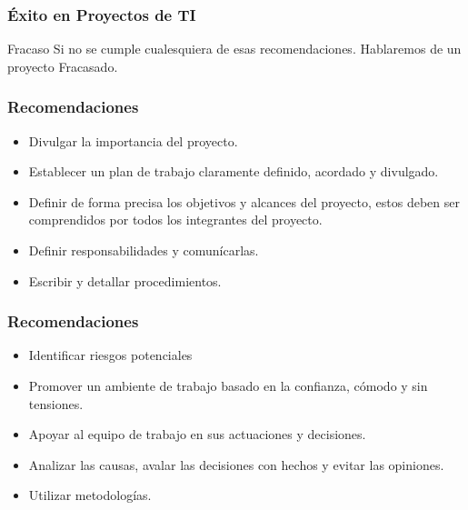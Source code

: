 \documentclass[12pt]{beamer}
\begin{document}
\begin{frame}
 \frametitle{Éxito en Proyectos de TI}
\begin{block}{Fracaso}
Si no se cumple cualesquiera de esas recomendaciones. Hablaremos de un proyecto \alert{Fracasado}. 
\end{block}
\end{frame}


\begin{frame}
 \frametitle{Recomendaciones}
\begin{itemize}
 \item<1-> Divulgar  la importancia del proyecto.
 \item<2-> Establecer  un plan de trabajo claramente definido, acordado y divulgado.
 \item<3-> Definir  de forma precisa los objetivos y alcances del proyecto, estos deben ser comprendidos por todos los integrantes del proyecto.
 \item<4-> Definir  responsabilidades y comunícarlas.
 \item<5-> Escribir y detallar procedimientos.
\end{itemize}
\end{frame}

\begin{frame}
 \frametitle{Recomendaciones}
\begin{itemize}
 \item<2-> Identificar riesgos potenciales
 \item<3-> Promover un ambiente de trabajo basado en la confianza, cómodo y sin tensiones.
 \item<4-> Apoyar al equipo de trabajo en sus actuaciones y decisiones.
 \item<5-> Analizar las causas, avalar las decisiones con hechos y evitar las opiniones.
 \item<6-> Utilizar metodologías.
\end{itemize}
\end{frame}



\end{document}
